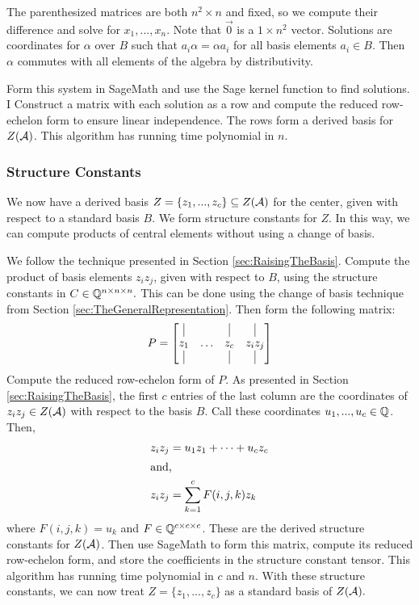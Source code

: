 \documentclass[../thesis.tex]{subfiles}
\begin{document}
The parenthesized matrices are both $n^2\times n$ and fixed, so we compute their difference and solve for $x_1,...,x_n.$ Note that $\Vec{0}$ is a $1\times n^2$ vector. Solutions are coordinates for $\alpha$ over $B$ such that $a_i\alpha = \alpha a_i$ for all basis elements $a_i\in B.$ Then $\alpha$ commutes with all elements of the algebra by distributivity. 

Form this system in SageMath and use the Sage kernel function to find solutions. I Construct a matrix with each solution as a row and compute the reduced row-echelon form to ensure linear independence. The rows form a derived basis for $Z(\mathcal{A})$. This algorithm has running time polynomial in $n.$

\subsubsection{Structure Constants}\label{sec:CenterStructureConstants}
We now have a derived basis $Z = \{z_1,...,z_c\}\subseteq Z(\mathcal{A})$ for the center, given with respect to a standard basis $B$. We form structure constants for $Z$. In this way, we can compute products of central elements without using a change of basis.

We follow the technique presented in Section \ref{sec:RaisingTheBasis}. Compute the product of basis elements $z_iz_j$, given with respect to $B$, using the structure constants in $C\in\mathbb{Q}^{n\times n\times n}.$ This can be done using the change of basis technique from Section \ref{sec:TheGeneralRepresentation}. Then form the following matrix:
\begin{equation*}
    P = \begin{bmatrix}
        \vline & &\vline &\vline\\
        z_1 & \hdots & z_c & z_iz_j\\
        \vline & &\vline &\vline
    \end{bmatrix}
\end{equation*}
Compute the reduced row-echelon form of $P$. As presented in Section \ref{sec:RaisingTheBasis}, the first $c$ entries of the last column are the coordinates of $z_iz_j\in Z(\mathcal{A})$ with respect to the basis $B.$ Call these coordinates $u_1,...,u_c\in\mathbb{Q}$. Then,
\begin{align*}
    z_iz_j &= u_1z_1 + \cdots + u_cz_c\\
\intertext{and,}
    z_iz_j &= \sum_{k=1}^c F(i,j,k)z_k
\end{align*}
where $F(i,j,k) = u_k$ and $F\in\mathbb{Q}^{c\times c\times c}$. These are the derived structure constants for $Z(\mathcal{A})$. Then use SageMath to form this matrix, compute its reduced row-echelon form, and store the coefficients in the structure constant tensor. This algorithm has running time polynomial in $c$ and $n.$ With these structure constants, we can now treat $Z=\{z_1,...,z_c\}$ as a standard basis of $Z(\mathcal{A}).$
\end{document}
